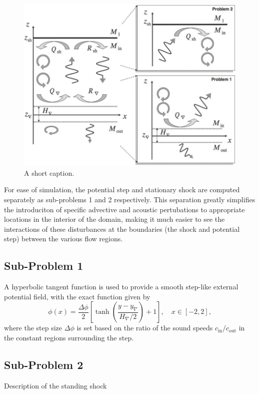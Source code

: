 \begin {figure}
\centering
\includegraphics[width=13cm]{figures/Sato1}
\caption {A short caption.}
\label{fig:Sato1}
\end{figure}

For ease of simulation, the potential step and stationary shock are computed separately as sub-problems 1 and 2 respectively. This separation greatly simplifies the introduciton of specific advective and acoustic pertubations to appropriate locations in the interior of the domain, making it much easier to see the interactions of these disturbances at the boundaries (the shock and potential step) between the various flow regions.

\subsection{Sub-Problem 1}
\label{subsec:sub_problem_1}

A hyperbolic tangent function is used to provide a smooth step-like external potential field, with the exact function given by
\begin{equation}
\phi(x)=\frac{\Delta \phi}{2}\left[\tanh\left(\frac{y-y_{\nabla}}{H_{\nabla}/2}\right)+1\right],\quad x\in[-2,2],
\end{equation}
where the step size $\Delta \phi$ is set based on the ratio of the sound speeds $c_{\textrm{in}}/c_{\textrm{out}}$ in the constant regions surrounding the step.

\subsection{Sub-Problem 2}

Description of the standing shock
